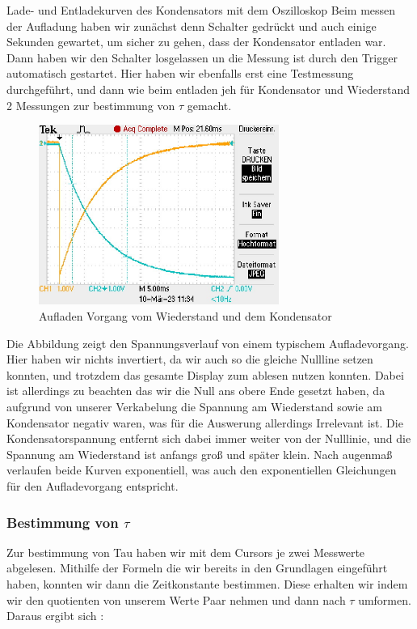 \documentclass[twoside]{protokoll}
\begin{document}
\begin{aufgabe}{Lade- und Entladekurven des Kondensators mit dem Oszilloskop}
Beim messen der Aufladung haben wir zunächst denn Schalter gedrückt und auch einige Sekunden gewartet, um sicher zu gehen, dass der Kondensator entladen war. 
Dann haben wir den Schalter losgelassen un die Messung ist durch den Trigger automatisch gestartet. 
Hier haben wir ebenfalls erst eine Testmessung durchgeführt, und dann wie beim entladen jeh für Kondensator und Wiederstand 2 Messungen zur bestimmung von $\tau$ gemacht. 

\begin{figure}[H]
  \centering
    \includegraphics[width=0.7\textwidth]{Bilder_Osziloskop/Aufladen_Kondensator_02.pdf}
    \caption{Aufladen Vorgang vom Wiederstand und dem Kondensator}
  \centering
\end{figure}
Die Abbildung zeigt den Spannungsverlauf von einem typischem Aufladevorgang.
Hier haben wir nichts invertiert, da wir auch so die gleiche Nullline setzen konnten, und trotzdem das gesamte Display zum ablesen nutzen konnten.
Dabei ist allerdings zu beachten das wir die Null ans obere Ende gesetzt haben, da aufgrund von unserer Verkabelung die Spannung am Wiederstand sowie am Kondensator negativ waren, was für die Auswerung allerdings Irrelevant ist.
Die Kondensatorspannung entfernt sich dabei immer weiter von der Nulllinie, und die Spannung am Wiederstand ist anfangs groß und später klein.
Nach augenmaß verlaufen beide Kurven exponentiell, was auch den exponentiellen Gleichungen für den Aufladevorgang entspricht.

\subsubsection{Bestimmung von $\tau$}

Zur bestimmung von Tau haben wir mit dem Cursors je zwei Messwerte abgelesen. 
Mithilfe der Formeln die wir bereits in den Grundlagen eingeführt haben, konnten wir dann die Zeitkonstante bestimmen. 
Diese erhalten wir indem wir den quotienten von unserem Werte Paar nehmen und dann nach $\tau$ umformen. Daraus ergibt sich :



\end{aufgabe}
\end{document}
